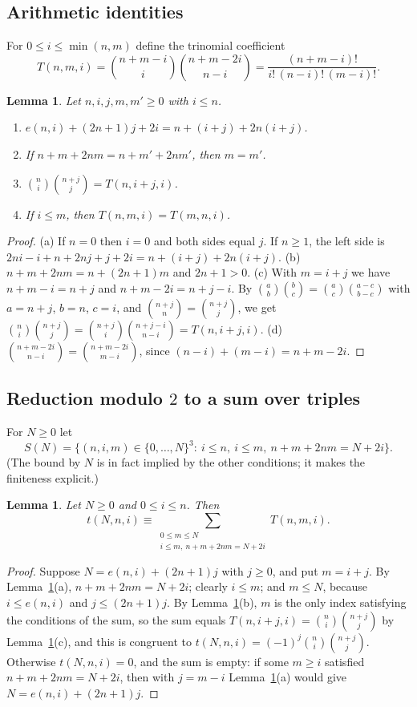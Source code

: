 \documentclass[11pt]{amsart}
\theoremstyle{plain}
\newtheorem{lemma}[theorem]{Lemma}
\theoremstyle{definition}
\begin{document}
\subsection{Arithmetic identities}
For $0\le i\le\min(n,m)$ define the trinomial coefficient
\[
  T(n,m,i)=\binom{n+m-i}{i}\binom{n+m-2i}{n-i}=\frac{(n+m-i)!}{i!\,(n-i)!\,(m-i)!}.
\]

\begin{lemma}\label{lem:arith}
Let $n,i,j,m,m'\ge0$ with $i\le n$.
\begin{enumerate}
\item[(a)] $e(n,i)+(2n+1)j+2i=n+(i+j)+2n(i+j)$.
\item[(b)] If $n+m+2nm=n+m'+2nm'$, then $m=m'$.
\item[(c)] $\binom ni\binom{n+j}{j}=T(n,i+j,i)$.
\item[(d)] If $i\le m$, then $T(n,m,i)=T(m,n,i)$.
\end{enumerate}
\end{lemma}

\begin{proof}
(a) If $n=0$ then $i=0$ and both sides equal $j$. If $n\ge1$, the left side is $2ni-i+n+2nj+j+2i=n+(i+j)+2n(i+j)$.
(b) $n+m+2nm=n+(2n+1)m$ and $2n+1>0$.
(c) With $m=i+j$ we have $n+m-i=n+j$ and $n+m-2i=n+j-i$. By $\binom{a}{b}\binom{b}{c}=\binom ac\binom{a-c}{b-c}$ with $a=n+j$, $b=n$, $c=i$, and $\binom{n+j}{n}=\binom{n+j}{j}$, we get $\binom ni\binom{n+j}j=\binom{n+j}{i}\binom{n+j-i}{n-i}=T(n,i+j,i)$.
(d) $\binom{n+m-2i}{n-i}=\binom{n+m-2i}{m-i}$, since $(n-i)+(m-i)=n+m-2i$.
\end{proof}

\subsection{Reduction modulo \texorpdfstring{$2$}{2} to a sum over triples}
For $N\ge0$ let
\[
  S(N)=\bigl\{(n,i,m)\in\{0,\dots,N\}^3:\ i\le n,\ i\le m,\ n+m+2nm=N+2i\bigr\}.
\]
(The bound by $N$ is in fact implied by the other conditions; it makes the finiteness explicit.)

\begin{lemma}\label{lem:termcast}
Let $N\ge0$ and $0\le i\le n$. Then
\[
  t(N,n,i)\equiv\sum_{\substack{0\le m\le N\\ i\le m,\ n+m+2nm=N+2i}}T(n,m,i).
\]
\end{lemma}

\begin{proof}
Suppose $N=e(n,i)+(2n+1)j$ with $j\ge0$, and put $m=i+j$. By Lemma~\ref{lem:arith}(a), $n+m+2nm=N+2i$; clearly $i\le m$; and $m\le N$, because $i\le e(n,i)$ and $j\le(2n+1)j$. By Lemma~\ref{lem:arith}(b), $m$ is the only index satisfying the conditions of the sum, so the sum equals $T(n,i+j,i)=\binom ni\binom{n+j}{j}$ by Lemma~\ref{lem:arith}(c), and this is congruent to $t(N,n,i)=(-1)^j\binom ni\binom{n+j}j$.
Otherwise $t(N,n,i)=0$, and the sum is empty: if some $m\ge i$ satisfied $n+m+2nm=N+2i$, then with $j=m-i$ Lemma~\ref{lem:arith}(a) would give $N=e(n,i)+(2n+1)j$.
\end{proof}
\end{document}
